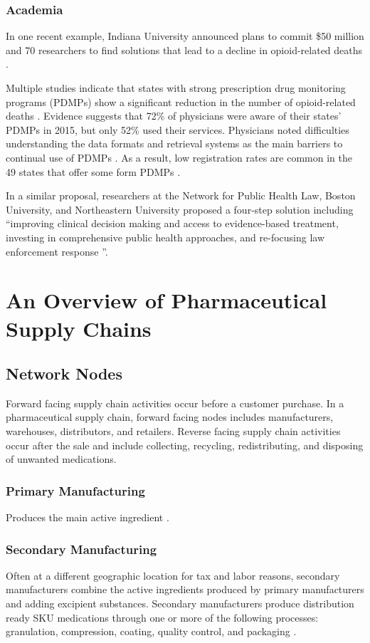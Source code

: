 \documentclass[sigconf]{acmart}
\begin{document}
\subsubsection{Academia}
In one recent example, Indiana University announced plans to commit \$50 million and 70 researchers to find solutions that lead to a decline in opioid-related deaths \cite{Rudavsky01}. 

Multiple studies indicate that states with strong prescription drug monitoring programs (PDMPs) show a significant reduction in the number of opioid-related deaths \cite{pardo01} \cite{patrick01}. Evidence suggests that 72\% of physicians were aware of their states' PDMPs in 2015, but only 52\% used their services. Physicians noted difficulties understanding the data formats and retrieval systems as the main barriers to continual use of PDMPs \cite{Rutkow01}. As a result, low registration rates are common in the 49 states that offer some form PDMPs \cite{Hawk01}.

In a similar proposal, researchers at the Network for Public Health Law, Boston University, and Northeastern University proposed a four-step solution including ``improving clinical decision making and access to evidence-based treatment, investing in comprehensive public health approaches, and re-focusing law enforcement response ''\cite{Davis01}.

\section{An Overview of Pharmaceutical Supply Chains}
\subsection{Network Nodes}
Forward facing supply chain activities occur before a customer purchase. In a pharmaceutical supply chain, forward facing nodes includes manufacturers, warehouses, distributors, and retailers. Reverse facing supply chain activities occur after the sale and include collecting, recycling, redistributing, and disposing of unwanted medications.  
\subsubsection{Primary Manufacturing} Produces the main active ingredient \cite{Shah01}.
\subsubsection{Secondary Manufacturing} Often at a different geographic location for tax and labor reasons, secondary manufacturers combine the active ingredients produced by primary manufacturers and adding excipient substances. Secondary manufacturers produce distribution ready SKU medications through one or more of the following processes: granulation, compression, coating, quality control, and packaging \cite{Shah01}.
\end{document}
